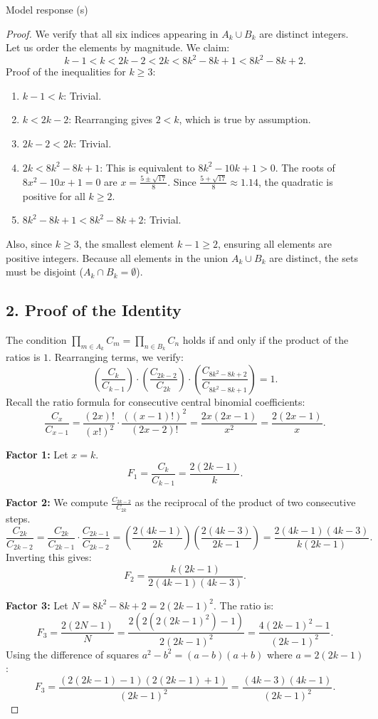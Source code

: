 \documentclass[11pt]{article}
\begin{document}
\begin{solution}{Model response (s)}
\begin{proof}
We verify that all six indices appearing in $A_k \cup B_k$ are distinct integers. Let us order the elements by magnitude. We claim:
\[ k-1 < k < 2k-2 < 2k < 8k^2-8k+1 < 8k^2-8k+2. \]
Proof of the inequalities for $k \ge 3$:
\begin{enumerate}
    \item $k-1 < k$: Trivial.
    \item $k < 2k-2$: Rearranging gives $2 < k$, which is true by assumption.
    \item $2k-2 < 2k$: Trivial.
    \item $2k < 8k^2-8k+1$: This is equivalent to $8k^2-10k+1 > 0$. The roots of $8x^2-10x+1=0$ are $x = \frac{5 \pm \sqrt{17}}{8}$. Since $\frac{5+\sqrt{17}}{8} \approx 1.14$, the quadratic is positive for all $k \ge 2$.
    \item $8k^2-8k+1 < 8k^2-8k+2$: Trivial.
\end{enumerate}

Also, since $k \ge 3$, the smallest element $k-1 \ge 2$, ensuring all elements are positive integers. Because all elements in the union $A_k \cup B_k$ are distinct, the sets must be disjoint ($A_k \cap B_k = \emptyset$).

\subsection*{2. Proof of the Identity}

The condition $\prod_{m \in A_k} C_m = \prod_{n \in B_k} C_n$ holds if and only if the product of the ratios is $1$. Rearranging terms, we verify:
\[ \left(\frac{C_k}{C_{k-1}}\right) \cdot \left(\frac{C_{2k-2}}{C_{2k}}\right) \cdot \left(\frac{C_{8k^2-8k+2}}{C_{8k^2-8k+1}}\right) = 1. \]
Recall the ratio formula for consecutive central binomial coefficients:
\[ \frac{C_x}{C_{x-1}} = \frac{(2x)!}{(x!)^2} \cdot \frac{((x-1)!)^2}{(2x-2)!} = \frac{2x(2x-1)}{x^2} = \frac{2(2x-1)}{x}. \]

\textbf{Factor 1:} Let $x=k$.
\[ F_1 = \frac{C_k}{C_{k-1}} = \frac{2(2k-1)}{k}. \]

\textbf{Factor 2:} We compute $\frac{C_{2k-2}}{C_{2k}}$ as the reciprocal of the product of two consecutive steps.
\[ \frac{C_{2k}}{C_{2k-2}} = \frac{C_{2k}}{C_{2k-1}} \cdot \frac{C_{2k-1}}{C_{2k-2}} = \left(\frac{2(4k-1)}{2k}\right) \left(\frac{2(4k-3)}{2k-1}\right) = \frac{2(4k-1)(4k-3)}{k(2k-1)}. \]
Inverting this gives:
\[ F_2 = \frac{k(2k-1)}{2(4k-1)(4k-3)}. \]

\textbf{Factor 3:} Let $N = 8k^2-8k+2 = 2(2k-1)^2$. The ratio is:
\[ F_3 = \frac{2(2N-1)}{N} = \frac{2(2(2(2k-1)^2)-1)}{2(2k-1)^2} = \frac{4(2k-1)^2 - 1}{(2k-1)^2}. \]
Using the difference of squares $a^2-b^2 = (a-b)(a+b)$ where $a=2(2k-1)$:
\[ F_3 = \frac{(2(2k-1)-1)(2(2k-1)+1)}{(2k-1)^2} = \frac{(4k-3)(4k-1)}{(2k-1)^2}. \]


\end{proof}
\end{solution}
\end{document}

